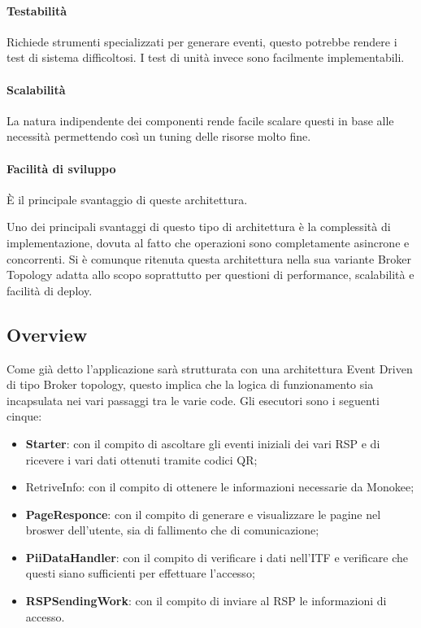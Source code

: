 \paragraph{Testabilità}
Richiede strumenti specializzati per generare eventi, questo potrebbe rendere i test di sistema difficoltosi. I test di unità invece sono facilmente implementabili. 
\paragraph{Scalabilità}
La natura indipendente dei componenti rende facile scalare questi in base alle necessità permettendo così un tuning delle risorse molto fine.
\paragraph{Facilità di sviluppo }
È il principale svantaggio di queste architettura.


Uno dei principali svantaggi di questo tipo di architettura è la complessità di implementazione, dovuta al fatto che operazioni sono completamente asincrone e concorrenti. Si è comunque ritenuta questa architettura nella sua variante Broker Topology adatta allo scopo soprattutto per questioni di performance, scalabilità e facilità di deploy.

\subsection{Overview}
Come già detto l’applicazione sarà strutturata con una architettura Event Driven di tipo Broker topology, questo implica che la logica di funzionamento sia incapsulata nei vari passaggi tra le varie code.
Gli esecutori sono i seguenti cinque:
\begin{itemize}
    \item \textbf{Starter}: con il compito di ascoltare gli eventi iniziali dei vari RSP e di ricevere i vari dati ottenuti tramite codici QR;
    \item RetriveInfo: con il compito di ottenere le informazioni necessarie da Monokee;
    \item \textbf{PageResponce}: con il compito di generare e visualizzare le pagine nel broswer dell’utente, sia di fallimento che di comunicazione;
    \item \textbf{PiiDataHandler}: con il compito di verificare i dati nell’ITF e verificare che questi siano sufficienti per effettuare l’accesso;
    \item \textbf{RSPSendingWork}: con il compito di inviare al RSP le informazioni di accesso.
\end{itemize}
    

